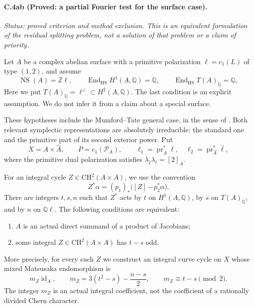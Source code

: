 \paragraph{C.4ab (Proved: a partial Fourier test for the surface case).}

\emph{Status: proved criterion and method exclusion. This is an
equivalent formulation of the residual splitting
problem, not a solution of that problem or a claim of priority.}

Let $A$ be a complex abelian surface with a primitive polarization
$\ell=c_1(L)$ of type $(1,2)$, and assume
\[
 \operatorname{NS}(A)=\mathbb Z\ell,\qquad
 \operatorname{End}_{\mathrm{HS}}H^1(A,\mathbb Q)=\mathbb Q,
 \qquad
 \operatorname{End}_{\mathrm{HS}}T(A)_{\mathbb Q}=\mathbb Q,
\]
Here we put $T(A)_{\mathbb Q}=\ell^\perp\subset H^2(A,\mathbb Q)$.
The last condition is an explicit assumption. We do not infer it
from a claim about a special surface.

These hypotheses include the Mumford--Tate general case, in the
sense of \citet[p.~2473]{cyVoisin2024}. Both relevant symplectic
representations are absolutely irreducible: the standard one
and the primitive part of its second exterior power. Put
\[
 X=A\times\widehat A,\qquad P=c_1(\mathcal P_A),\qquad
 \ell_1=\operatorname{pr}_A^*\ell,
 \quad \ell_2=\operatorname{pr}_{\widehat A}^*\widehat\ell,
\]
where the primitive dual polarization satisfies
$\lambda_{\widehat\ell}\lambda_\ell=[2]_A$.

For an integral cycle $Z\in\mathrm{CH}^2(A\times A)$, we use
the convention
\[
 Z^*\alpha=(p_1)_*\bigl([Z]\smile p_2^*\alpha\bigr).
\]
There are integers $t,s,n$ such that $Z^*$ acts by $t$ on
$H^1(A,\mathbb Q)$, by $s$ on $T(A)_{\mathbb Q}$, and by $n$
on $\mathbb Q\ell$. The following conditions are equivalent:
\begin{enumerate}
\item $A$ is an actual direct summand of a product of Jacobians;
\item some integral $Z\in\mathrm{CH}^2(A\times A)$ has
      $t-s$ odd.
\end{enumerate}
More precisely, for every such $Z$ we construct an integral curve
cycle on $X$ whose mixed Matsusaka endomorphism is
\[
 m_Z\operatorname{id}_A,
 \qquad
 m_Z=3(t^2-s)-\frac{n-s}{2},
 \qquad m_Z\equiv t-s\pmod2.                         \tag{PF.1}
\]
The integer $m_Z$ is an actual integral coefficient, not the
coefficient of a rationally divided Chern character.

